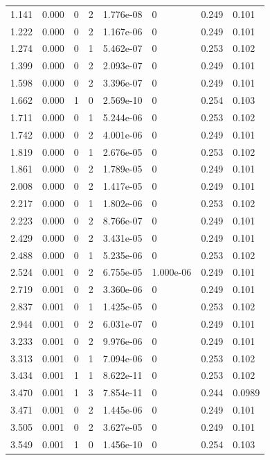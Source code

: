 \documentclass[preview]{standalone}
\begin{document}
{{\begin{tabular}{L{1.2cm}C{1.2cm} C{0.3cm}C{0.5cm} C{1.4cm}C{1.4cm} C{1.4cm}C{1.4cm}}
  1.141  &  0.000  & 0     &  2 &  1.776e-08  & 0  & 0.249 &  0.101   \\ 
  1.222  &  0.000  & 0     &  2 &  1.167e-06  & 0  & 0.249 &  0.101   \\ 
  1.274  &  0.000  & 0     &  1 &  5.462e-07  & 0  & 0.253 &  0.102   \\ 
  1.399  &  0.000  & 0     &  2 &  2.093e-07  & 0  & 0.249 &  0.101   \\ 
  1.598  &  0.000  & 0     &  2 &  3.396e-07  & 0  & 0.249 &  0.101   \\ 
  1.662  &  0.000  & 1     &  0 &  2.569e-10  & 0  & 0.254 &  0.103   \\ 
  1.711  &  0.000  & 0     &  1 &  5.244e-06  & 0  & 0.253 &  0.102   \\ 
  1.742  &  0.000  & 0     &  2 &  4.001e-06  & 0  & 0.249 &  0.101   \\ 
  1.819  &  0.000  & 0     &  1 &  2.676e-05  & 0  & 0.253 &  0.102   \\ 
  1.861  &  0.000  & 0     &  2 &  1.789e-05  & 0  & 0.249 &  0.101   \\ 
  2.008  &  0.000  & 0     &  2 &  1.417e-05  & 0  & 0.249 &  0.101   \\ 
  2.217  &  0.000  & 0     &  1 &  1.802e-06  & 0  & 0.253 &  0.102   \\ 
  2.223  &  0.000  & 0     &  2 &  8.766e-07  & 0  & 0.249 &  0.101   \\ 
  2.429  &  0.000  & 0     &  2 &  3.431e-05  & 0  & 0.249 &  0.101   \\ 
  2.488  &  0.000  & 0     &  1 &  5.235e-06  & 0  & 0.253 &  0.102   \\ 
  2.524  &  0.001  & 0     &  2 &  6.755e-05  & 1.000e-06  & 0.249 &  0.101   \\ 
  2.719  &  0.001  & 0     &  2 &  3.360e-06  & 0  & 0.249 &  0.101   \\ 
  2.837  &  0.001  & 0     &  1 &  1.425e-05  & 0  & 0.253 &  0.102   \\ 
  2.944  &  0.001  & 0     &  2 &  6.031e-07  & 0  & 0.249 &  0.101   \\ 
  3.233  &  0.001  & 0     &  2 &  9.976e-06  & 0  & 0.249 &  0.101   \\ 
  3.313  &  0.001  & 0     &  1 &  7.094e-06  & 0  & 0.253 &  0.102   \\ 
  3.434  &  0.001  & 1     &  1 &  8.622e-11  & 0  & 0.253 &  0.102   \\ 
  3.470  &  0.001  & 1     &  3 &  7.854e-11  & 0  & 0.244 &  0.0989   \\ 
  3.471  &  0.001  & 0     &  2 &  1.445e-06  & 0  & 0.249 &  0.101   \\ 
  3.505  &  0.001  & 0     &  2 &  3.627e-05  & 0  & 0.249 &  0.101   \\ 
  3.549  &  0.001  & 1     &  0 &  1.456e-10  & 0  & 0.254 &  0.103   \\ 
\hline 
\end{tabular} 

}}
\end{document}
